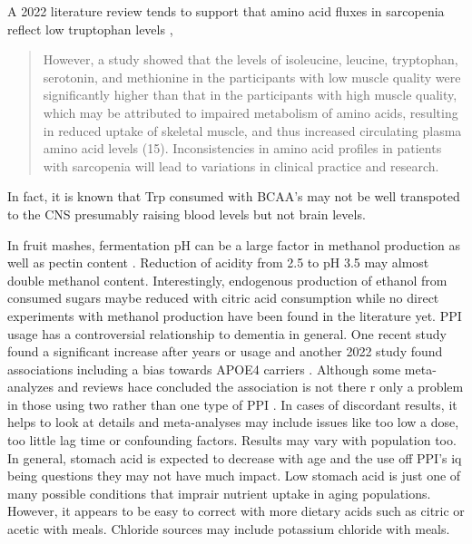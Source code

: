 \documentclass[aps,secnumarabic,balancelastpage,amsmath,amssymb,nofootinbib]{revtex4}
\begin{document}
A  2022  literature review tends to support that amino acid
fluxes in sarcopenia reflect low truptophan levels
\cite{10.3389/fendo.2021.725518},
\begin{quote}
However, a study showed that the levels of isoleucine, leucine, tryptophan, serotonin, and methionine in the participants with low muscle quality were significantly higher than that in the participants with high muscle quality, which may be attributed to impaired metabolism of amino acids, resulting in reduced uptake of skeletal muscle, and thus increased circulating plasma amino acid levels (15). Inconsistencies in amino acid profiles in patients with sarcopenia will lead to variations in clinical practice and research.
\end{quote}

In fact, it is known that Trp consumed with BCAA's may not be well transpoted
to the CNS presumably raising blood levels but not brain levels. 

In fruit mashes, fermentation pH can be a large factor in methanol
production as well as pectin content 
\cite{Blumenthal_Steger_Einfalt_Methanol_Mitigation_during_Manufacturing_2021}.
Reduction of acidity from 2.5 to pH 3.5 may almost double
methanol content. 
Interestingly, endogenous production of ethanol from consumed
sugars maybe reduced with citric acid consumption 
\cite{10.3389/fmicb.2016.00047} while no direct experiments
with methanol production have been found in the literature yet.
PPI usage has a controversial relationship to dementia
in general. 
One recent study found a significant increase after years or usage
\cite{Northuis10.1212/WNL.0000000000207747}
and another 2022 study found associations
including a  bias towards APOE4 carriers
\cite{Zhang_Li_Chen_Regular_proton_pump_inhibitor_2022}.
Although some meta-analyzes and reviews hace concluded the association is
not there 
\cite{PMC10229084}
r only a problem in those using two rather than one type of PPI
\cite{TorresBondia_Dakterzada_Galvan_Proton_pump_inhibitors_2020}.
In cases of discordant results, it helps to look at details and meta-analyses
may include issues like too low a dose, too little lag time or 
confounding factors. Results may vary with population too.
In general, stomach acid is expected to decrease with age
and the use off PPI's iq being questions \cite{Mehta_Guasch_Kamen_Proton_Pump_Inhibitors_2020} they may not have much impact. 
Low stomach acid is just one of many possible conditions
that imprair nutrient uptake in aging populations.
However, it appears to be easy to correct with more
dietary acids such as citric or acetic with meals.
Chloride sources may include potassium chloride with meals.
\end{document}
